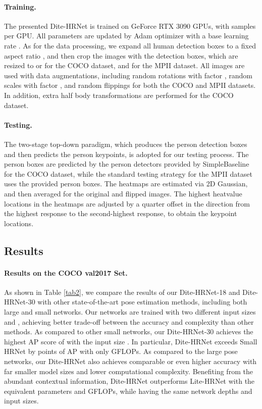 \documentclass{article}
\begin{document}
\paragraph{Training.} The presented Dite-HRNet is trained on  GeForce RTX 3090 GPUs, with  samples per GPU. All parameters are updated by Adam optimizer with a base learning rate . As for the data processing, we expand all human detection boxes to a fixed aspect ratio , and then crop the images with the detection boxes, which are resized to  or  for the COCO dataset, and  for the MPII dataset. All images are used with data augmentations, including random rotations with factor , random scales with factor , and random flippings for both the COCO and MPII datasets. In addition, extra half body transformations are performed for the COCO dataset.

\paragraph{Testing.} The two-stage top-down paradigm, which produces the person detection boxes and then predicts the person keypoints, is adopted for our testing process. The person boxes are predicted by the person detectors provided by SimpleBaseline \cite{xiao:simple} for the COCO dataset, while the standard testing strategy for the MPII dataset uses the provided person boxes. The heatmaps are estimated via 2D Gaussian, and then averaged for the original and flipped images. The highest heatvalue locations in the heatmaps are adjusted by a quarter offset in the direction from the highest response to the second-highest response, to obtain the keypoint locations.

\subsection{Results}

\paragraph{Results on the COCO val2017 Set.} As shown in Table \ref{tab2}, we compare the results of our Dite-HRNet-18 and Dite-HRNet-30 with other state-of-the-art pose estimation methods, including both large and small networks. Our networks are trained with two different input sizes  and , achieving better trade-off between the accuracy and complexity than other methods. As compared to other small networks, our Dite-HRNet-30 achieves the highest AP score of  with the input size . In particular, Dite-HRNet exceeds Small HRNet \cite{wang:smallhrnet} by  points of AP with only  GFLOPs. As compared to the large pose networks, our Dite-HRNet also achieves comparable or even higher accuracy with far smaller model sizes and lower computational complexity. Benefiting from the abundant contextual information, Dite-HRNet outperforms Lite-HRNet \cite{yu:litehrnet} with the equivalent parameters and GFLOPs, while having the same network depths and input sizes.
\end{document}
